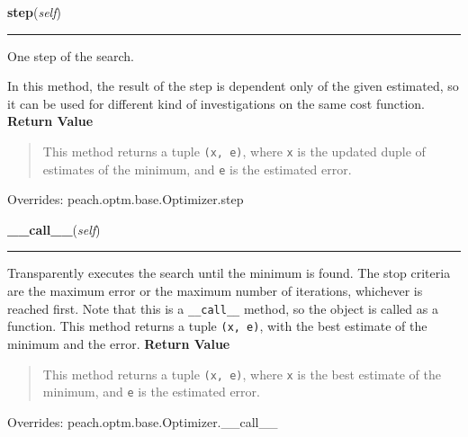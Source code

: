 \hspace{.8\funcindent}\begin{boxedminipage}{\funcwidth}

    \raggedright \textbf{step}(\textit{self})

    \vspace{-1.5ex}

    \rule{\textwidth}{0.5\fboxrule}
\setlength{\parskip}{2ex}

One step of the search.

In this method, the result of the step is dependent only of the given
estimated, so it can be used for different kind of investigations on the
same cost function.
\setlength{\parskip}{1ex}
      \textbf{Return Value}
    \vspace{-1ex}

      \begin{quote}

This method returns a tuple \texttt{(x, e)}, where \texttt{x} is the updated
duple of estimates of the minimum, and \texttt{e} is the estimated error.
      \end{quote}

      Overrides: peach.optm.base.Optimizer.step

    \end{boxedminipage}

    \vspace{0.5ex}

\hspace{.8\funcindent}\begin{boxedminipage}{\funcwidth}

    \raggedright \textbf{\_\_call\_\_}(\textit{self})

    \vspace{-1.5ex}

    \rule{\textwidth}{0.5\fboxrule}
\setlength{\parskip}{2ex}

Transparently executes the search until the minimum is found. The stop
criteria are the maximum error or the maximum number of iterations,
whichever is reached first. Note that this is a \texttt{\_\_call\_\_} method, so
the object is called as a function. This method returns a tuple
\texttt{(x, e)}, with the best estimate of the minimum and the error.
\setlength{\parskip}{1ex}
      \textbf{Return Value}
    \vspace{-1ex}

      \begin{quote}

This method returns a tuple \texttt{(x, e)}, where \texttt{x} is the best
estimate of the minimum, and \texttt{e} is the estimated error.
      \end{quote}

      Overrides: peach.optm.base.Optimizer.\_\_call\_\_

    \end{boxedminipage}


